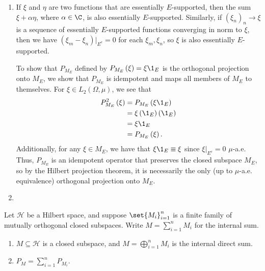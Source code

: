 \documentclass[10pt]{mypackage}
\begin{document}
\begin{solution}[]\hfill
  \begin{enumerate}[(1)]
    \item If $\xi$ and $\eta$ are two functions that are essentially $E$-supported, then the sum $\xi + \alpha \eta$, where $\alpha\in \C$, is also essentially $E$-supported. Similarly, if $\left(\xi_n\right)_n\rightarrow \xi$ is a sequence of essentially $E$-supported functions converging in norm to $\xi$, then we have $\left(\xi_m - \xi_{n}\right)|_{E^{c}} = 0$ for each $\xi_{m},\xi_{n}$, so $\xi$ is also essentially $E$-supported.\newline

      To show that $P_{M_E}$ defined by $P_{M_E}\left(\xi\right) = \xi \1_{E}$ is the orthogonal projection onto $M_{E}$, we show that $P_{M_E}$ is idempotent and maps all members of $M_{E}$ to themselves. For $\xi\in L_{2}\left(\Omega,\mu\right)$, we see that
      \begin{align*}
        P_{M_E}^2\left(\xi\right) &= P_{M_E}\left(\xi \1_{E}\right)\\
                                  &= \xi\left(\1_{E}\right)\left(\1_{E}\right)\\
                                  &= \xi \1_{E}\\
                                  &= P_{M_E}\left(\xi\right).
      \end{align*}
      Additionally, for any $\xi\in M_{E}$, we have that $\xi \1_{E} \equiv \xi$ since $\xi|_{E^c} = 0$ $\mu$-a.e. Thus, $P_{M_E}$ is an idempotent operator that preserves the closed subspace $M_{E}$, so by the Hilbert projection theorem, it is necessarily the only (up to $\mu$-a.e. equivalence) orthogonal projection onto $M_{E}$.
    \item 
  \end{enumerate}
\end{solution}
\begin{proposition}
  Let $\mathcal{H}$ be a Hilbert space, and suppose $\set{M_i}_{i=1}^{n}$ is a finite family of mutually orthogonal closed subspaces. Write $M = \sum_{i=1}^{n}M_i$ for the internal sum.
  \begin{enumerate}[(1)]
    \item $M\subseteq \mathcal{H}$ is a closed subspace, and $M = \bigoplus_{i=1}^{n}M_i$ is the internal direct sum.
    \item $P_{M} = \sum_{i=1}^{n}P_{M_i}$.
  \end{enumerate}
\end{proposition}
\end{document}
